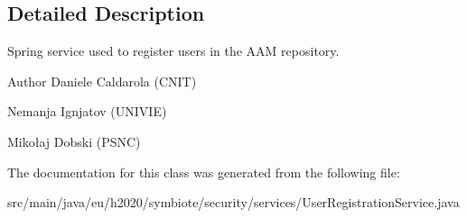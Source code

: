\subsection{Detailed Description}
Spring service used to register users in the A\+AM repository.

\begin{DoxyAuthor}{Author}
Daniele Caldarola (C\+N\+IT) 

Nemanja Ignjatov (U\+N\+I\+V\+IE) 

Mikołaj Dobski (P\+S\+NC) 
\end{DoxyAuthor}


The documentation for this class was generated from the following file\+:\begin{DoxyCompactItemize}
\item 
src/main/java/eu/h2020/symbiote/security/services/User\+Registration\+Service.\+java\end{DoxyCompactItemize}
